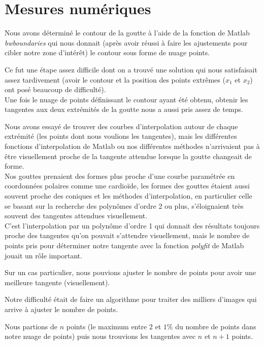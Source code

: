 \documentclass[french]{article}
\begin{document}
\section{Mesures numériques}

Nous avons déterminé le contour de la goutte à l'aide de la fonction de Matlab \emph{bwboundaries} qui nous donnait (après avoir réussi à faire les ajustements pour cibler notre zone d'intérêt) le contour sous forme de nuage points.

Ce fut une étape assez difficile dont on a trouvé une solution qui nous satisfaisait assez tardivement (avoir le contour et la position des points extrêmes ($x_{1}$ et $x_{2}$) ont posé beaucoup de difficulté).  \\

Une fois le nuage de points définissant le contour ayant été obtenu, obtenir les tangentes aux deux extrémités de la goutte nous a aussi pris assez de temps.

Nous avons essayé de trouver des courbes d'interpolation autour de chaque extrémité (les points dont nous voulions les tangentes), mais les différentes fonctions d'interpolation de Matlab ou nos différentes méthodes n'arrivaient pas à être visuellement proche de la tangente attendue lorsque la goutte changeait de forme.\\

Nos gouttes prenaient des formes plus proche d'une courbe paramétrée en coordonnées polaires comme une cardioïde, les formes des gouttes étaient aussi souvent proche des coniques et les méthodes d'interpolation, en particulier celle se basant sur la recherche des polynômes d'ordre 2 ou plus, s'éloignaient très souvent des tangentes attendues visuellement.\\

C'est l'interpolation par un polynôme d'ordre 1 qui donnait des résultats toujours proche des tangentes qu'on pouvait s'attendre visuellement, mais le nombre de points pris pour déterminer notre tangente avec la fonction \emph{polyfit} de Matlab jouait un rôle important.

Sur un cas particulier, nous pouvions ajuster le nombre de points pour avoir une meilleure tangente (visuellement).

Notre difficulté était de faire un algorithme pour traiter des milliers d'images qui arrive à ajuster le nombre de points.

Nous partions de $n$ points (le maximum entre 2 et $1\%$ du nombre de points dans notre nuage de points) puis nous trouvions les tangentes avec $n$ et $n+1$ points.
\end{document}
